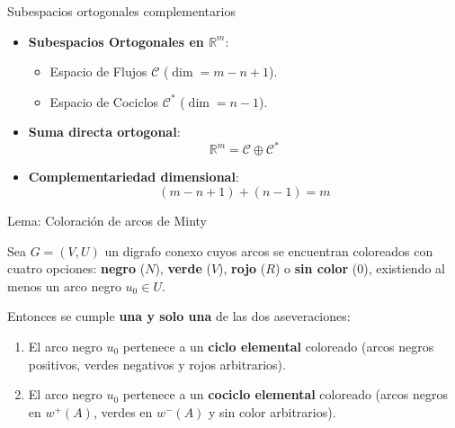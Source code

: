 \documentclass[
  ignorenonframetext,
]{beamer}
\providecommand{\tightlist}{%
  \setlength{\itemsep}{0pt}\setlength{\parskip}{0pt}}
\begin{document}
\begin{frame}{Subespacios ortogonales complementarios}
\label{subespacios-ortogonales-complementarios}
\begin{itemize}
\item
  \textbf{Subespacios Ortogonales en \(\mathbb{R}^m\)}:

  \begin{itemize}
  \tightlist
  \item
    Espacio de Flujos \(\mathcal{C}\) (\(\dim = m - n + 1\)).
  \item
    Espacio de Cociclos \(\mathcal{C}^*\) (\(\dim = n - 1\)).
  \end{itemize}
\item
  \textbf{Suma directa ortogonal}:
  \[\mathbb{R}^m = \mathcal{C} \oplus \mathcal{C}^*\]
\item
  \textbf{Complementariedad dimensional}: \[(m - n + 1) + (n - 1) = m\]
\end{itemize}
\end{frame}

\begin{frame}{Lema: Coloración de arcos de Minty}
\label{lema-coloraciuxf3n-de-arcos-de-minty}
\begin{tcolorbox}[enhanced jigsaw, opacityback=0, breakable, title=\textcolor{quarto-callout-note-color}{\faInfo}\hspace{0.5em}{Coloración de arcos de Minty}, colback=white, colbacktitle=quarto-callout-note-color!10!white, bottomrule=.15mm, opacitybacktitle=0.6, coltitle=black, bottomtitle=1mm, leftrule=.75mm, colframe=quarto-callout-note-color-frame, toptitle=1mm, titlerule=0mm, rightrule=.15mm, left=2mm, arc=.35mm, toprule=.15mm]

Sea \(G = (V, U)\) un digrafo conexo cuyos arcos se encuentran
coloreados con cuatro opciones: \textbf{negro} (\(N\)), \textbf{verde}
(\(V\)), \textbf{rojo} (\(R\)) o \textbf{sin color} (\(0\)), existiendo
al menos un arco negro \(u_0 \in U\).

Entonces se cumple \textbf{una y solo una} de las dos aseveraciones:

\begin{enumerate}
\tightlist
\item
  El arco negro \(u_0\) pertenece a un \textbf{ciclo elemental}
  coloreado (arcos negros positivos, verdes negativos y rojos
  arbitrarios).
\item
  El arco negro \(u_0\) pertenece a un \textbf{cociclo elemental}
  coloreado (arcos negros en \(w^+(A)\), verdes en \(w^-(A)\) y sin
  color arbitrarios).
\end{enumerate}

\end{tcolorbox}
\end{frame}
\end{document}

